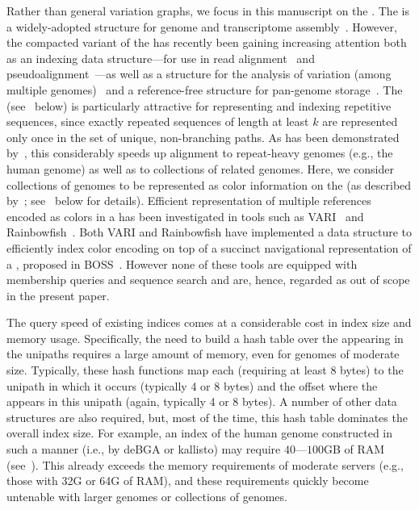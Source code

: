 Rather than general variation graphs, we focus in this manuscript on the \dbg.
The \dbg is a widely-adopted structure for genome and transcriptome
assembly~\citep{Grabherr11Full,pevzner2001eulerian,haas2013novo}.
However, the compacted variant of the \dbg has recently been gaining increasing attention both as an
indexing data structure---for use in read alignment~\citep{liu2016debga} and
pseudoalignment~\citep{Bray2016Kallisto}---as well as a structure for the analysis
of variation (among multiple genomes)~\citep{minkin2016twopaco} and a reference-free structure for pan-genome storage~\citep{holley2016bloom}. The
\ccdbg~\citep{chikhi2014representation,sibelia,movahedi2012novo} (see~ below) is particularly attractive for
representing and indexing repetitive sequences, since exactly repeated sequences
of length at least $k$ are represented only once in the set of unique, non-branching paths.
As has been demonstrated by~\citet{liu2016debga}, this considerably speeds up
alignment to repeat-heavy genomes (e.g., the human genome) as well as to collections of related genomes.
Here, we consider collections of genomes to be represented as color information on the \dbg
(as described by~\citet{Iqbal2012Novo}; see~ below for details).
Efficient representation of multiple references encoded as colors in a \dbg has
been investigated in tools such as VARI~\citep{MuggliBoNo17} and
Rainbowfish~\citep{rainbowfish}. Both VARI and Rainbowfish have implemented a data
structure to efficiently index color encoding on top of a succinct navigational
representation of a \dbg, proposed in BOSS~\citep{BoweOn12}. However none of
these tools are equipped with membership queries and sequence search and are, hence,
regarded as out of scope in the present paper.

The query speed of existing \ccdbg indices comes at a considerable
cost in index size and memory usage. Specifically, the need to build a hash
table over the \kmers appearing in the \dbg unipaths requires a large amount of
memory, even for genomes of moderate size. Typically, these hash functions map
each \kmer (requiring at least 8 bytes) to the unipath in which it occurs
(typically 4 or 8 bytes) and the offset where the \kmer appears in this unipath
(again, typically 4 or 8 bytes). A number of other data structures are also
required, but, most of the time, this hash table dominates the overall index size. For
example, an index of the human genome constructed in such a manner (i.e., by
deBGA or kallisto) may require $40$---$100$GB of RAM (see~). This already exceeds the
memory requirements of moderate servers (e.g., those with 32G or 64G of RAM), and these
requirements quickly become untenable with larger genomes or collections of
genomes.


